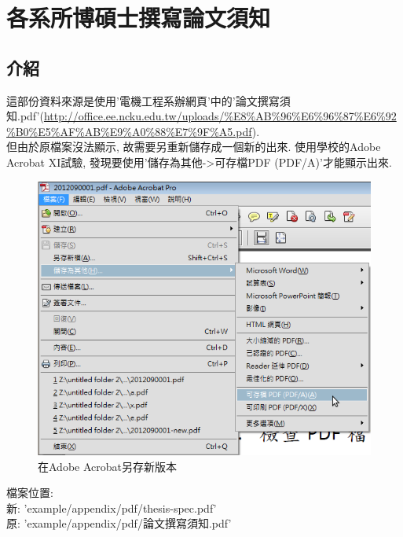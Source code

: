 \newpage
{}

\chapter{各系所博碩士撰寫論文須知}
\label{appendix:thesis-spec}

\section{介紹}
這部份資料來源是使用'電機工程系辦網頁'中的'論文撰寫須知.pdf'(\url{http://office.ee.ncku.edu.tw/uploads/%E8%AB%96%E6%96%87%E6%92%B0%E5%AF%AB%E9%A0%88%E7%9F%A5.pdf}).\\

但由於原檔案沒法顯示, 故需要另重新儲存成一個新的出來. 使用學校的Adobe Acrobat XI試驗, 發現要使用'儲存為其他->可存檔PDF (PDF/A)'才能顯示出來.\\

\begin{figure}[h]
\centering
\includegraphics[scale=0.3]{./example/appendix/pic/save_pdf.png}
\caption{在Adobe Acrobat另存新版本}
\label{fig:appendix:save_pdf}
\end{figure}

檔案位置:\\
新: 'example/appendix/pdf/thesis-spec.pdf'\\
原: 'example/appendix/pdf/論文撰寫須知.pdf'\\



